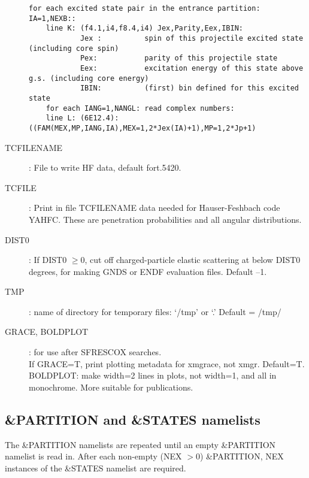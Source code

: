 \documentclass[11pt]{article}
\begin{document}
\begin{description}
{\begin{verbatim}
for each excited state pair in the entrance partition: IA=1,NEXB::
    line K: (f4.1,i4,f8.4,i4) Jex,Parity,Eex,IBIN:
            Jex :          spin of this projectile excited state (including core spin)
            Pex:           parity of this projectile state
            Eex:           excitation energy of this state above g.s. (including core energy)
            IBIN:          (first) bin defined for this excited state
    for each IANG=1,NANGL: read complex numbers:
    line L: (6E12.4): ((FAM(MEX,MP,IANG,IA),MEX=1,2*Jex(IA)+1),MP=1,2*Jp+1)
\end{verbatim}
}

\item[TCFILENAME]: 
File to write HF data, default fort.5420.

\item[TCFILE]: 
Print in file TCFILENAME data needed for Hauser-Feshbach code YAHFC. These are penetration probabilities and  all angular distributions.

\item[DIST0] :
If DIST0 $\geq 0$, cut off charged-particle elastic scattering at below DIST0 degrees, for making GNDS or ENDF evaluation files. Default --1.

\item[TMP]:  name of directory for temporary files: `/tmp' or `.'  Default = /tmp/

\item[GRACE, BOLDPLOT] : for use after SFRESCOX searches.\\
If GRACE=T, print plotting metadata for xmgrace, not xmgr. Default=T.\\
BOLDPLOT: make width=2 lines in plots, not width=1, and all in monochrome. More suitable for publications.

\end{description}


\subsection{\&PARTITION and \&STATES namelists}
%
The \&PARTITION namelists are repeated until an empty \&PARTITION namelist is read in.
After each non-empty (NEX $> 0$) \&PARTITION, NEX instances of the \&STATES namelist are required.
\end{document}
